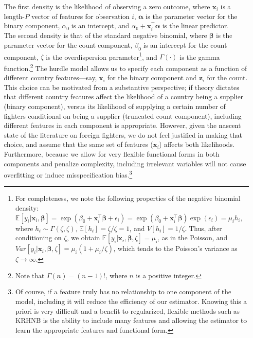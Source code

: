 \documentclass[12pt]{article}
\newcommand{\x}{\mathbf{x}}
\newcommand{\z}{\mathbf{z}}
\newcommand{\bbeta}{\bm{\beta}}
\newcommand{\balpha}{\bm{\alpha}}
\newcommand{\E}{\mathbb{E}}
\begin{document}
The first density is the likelihood of observing a zero outcome, where $\x_i$ is a length-$P$ vector of features for observation $i$, $\balpha$ is the parameter vector for the binary component, $\alpha_0$ is an intercept, and  $\alpha_0 + \x^\top_i\balpha$ is the linear predictor. \\

The second density is that of the standard negative binomial, where $\bbeta$ is the parameter vector for the count component, $\beta_0$ is an intercept for the count component, $\zeta$ is the overdispersion parameter\footnote{For completeness, we note the following properties of the negative binomial density: $\E[y_i|\x_i, \bbeta] = \exp(\beta_0 + \x^\top_i\bbeta + \epsilon_i) = \exp(\beta_0 + \x^\top_i\bbeta) \exp(\epsilon_i) = \mu_i h_i$, where $h_i \sim \Gamma(\zeta,\zeta)$, \; $\E[h_i]= \zeta/\zeta = 1$, and $V[h_i]=1/\zeta$. Thus, after conditioning on $\zeta$, we obtain $\E[y_i | \x_i, \bbeta, \zeta] = \mu_i$, as in the Poisson, and $Var[y_i | \x_i, \bbeta, \zeta] = \mu_i(1+\mu_i/\zeta)$, which tends to the Poisson's variance as $\zeta \rightarrow \infty$.}, and $\Gamma(\cdot)$ is the gamma function.\footnote{Note that $\Gamma(n)=(n-1)!$, where $n$ is a positive integer.} The hurdle model allows us to specify each component as a function of different country features---say, $\x_i$ for the binary component and $\z_i$ for the count. This choice can be motivated from a substantive perspective; if theory dictates that different country features affect the likelihood of a country being a supplier (binary component), versus its likelihood of supplying a certain number of fighters conditional on being a supplier (truncated count component), including different features in each component is appropriate. However, given the nascent state of the literature on foreign fighters, we do not feel justified in making that choice, and assume that the same set of features ($\x_i$) affects both likelihoods. Furthermore, because we allow for very flexible functional forms in both components and penalize complexity, including irrelevant variables will not cause overfitting or induce misspecification bias.\footnote{Of course, if a feature truly has no relationship to one component of the model, including it will reduce the efficiency of our estimator. Knowing this a priori is very difficult and a benefit to regularized, flexible methods such as KRHNB is the ability to include many features and allowing the estimator to learn the appropriate features and functional form.}	\\
\end{document}
